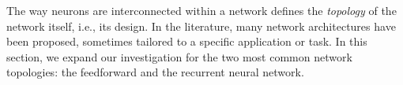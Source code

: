 \documentclass[12pt, a4paper, twoside, openright, notitlepage]{report}
\numberwithin{equation}{chapter}
\theoremstyle{theorem}
\theoremstyle{definition}
\theoremstyle{remark}
\theoremstyle{proposition}
\numberwithin{figure}{chapter}
\begin{document}
		The way neurons are interconnected within a network defines the \emph{topology} of the network itself, i.e., its design. In the literature, many network architectures have been proposed, sometimes tailored to a specific application or task. In this section, we expand our investigation for the two most common network topologies: the feedforward and the recurrent neural network.
		
		\begin{figure}[t]
			\center
			\hspace*{-0.4cm}

\end{figure}
\end{document}

